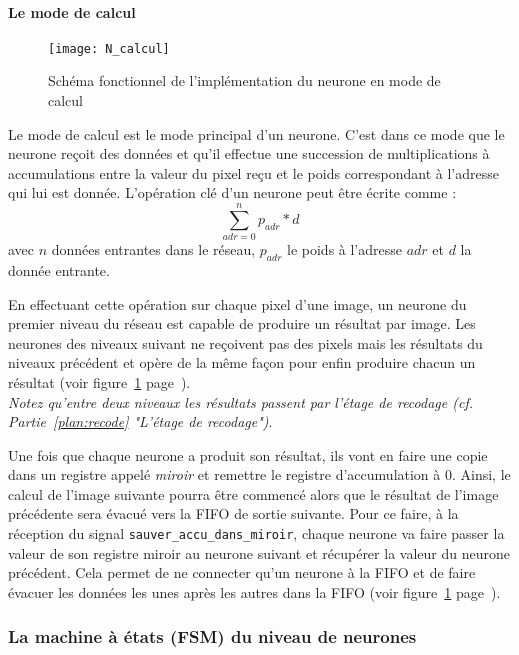 	\paragraph{Le mode de calcul\\}
	\begin{figure}[h!]
		\begin{center}
			\texttt{[image: N\_calcul]}
			\caption{Schéma fonctionnel de l'implémentation du neurone en mode de calcul}
			\label{fig:N_calcul}
		\end{center}
	\end{figure}

	Le mode de calcul est le mode principal d'un neurone. C'est dans ce mode que le neurone
	reçoit des données et qu'il effectue une succession de multiplications à accumulations entre
	la valeur du pixel reçu et le poids correspondant à l'adresse qui lui est donnée. L'opération clé
	d'un neurone peut être écrite comme :
	$$\sum_{adr=0}^n p_{adr}*d$$
	avec $n$ données entrantes dans le réseau, $p_{adr}$ le poids à l'adresse $adr$
	et $d$ la donnée entrante.

	En effectuant cette opération sur chaque pixel d'une image, un neurone du premier niveau du réseau
	est capable de produire un résultat par image. Les neurones des niveaux suivant ne reçoivent
	pas des pixels mais les résultats du niveaux précédent et opère de la même façon pour enfin
	produire chacun un résultat (voir figure~\ref{fig:N_calcul} page~\pageref{fig:N_calcul}).
	\\{\em Notez qu'entre deux niveaux les résultats passent par l'étage de recodage
	(cf. Partie~\ref{plan:recode} "L'étage de recodage")}.

	Une fois que chaque neurone a produit son résultat, ils vont en faire une copie dans
	un registre appelé {\em miroir} et remettre le registre d'accumulation à 0. Ainsi,
	le calcul de l'image suivante pourra être commencé alors que le résultat de l'image précédente
	sera évacué vers la FIFO de sortie suivante. Pour ce faire, à la réception du signal
	\texttt{sauver\_accu\_dans\_miroir}, chaque neurone va faire passer la valeur de son
	registre miroir au neurone suivant et récupérer la valeur du neurone précédent.
	Cela permet de ne connecter qu'un neurone à la FIFO
	et de faire évacuer les données les unes après les autres dans la FIFO
	(voir figure~\ref{fig:N_calcul} page~\pageref{fig:N_calcul}).

\subsubsection{La machine à états (FSM) du niveau de neurones}

